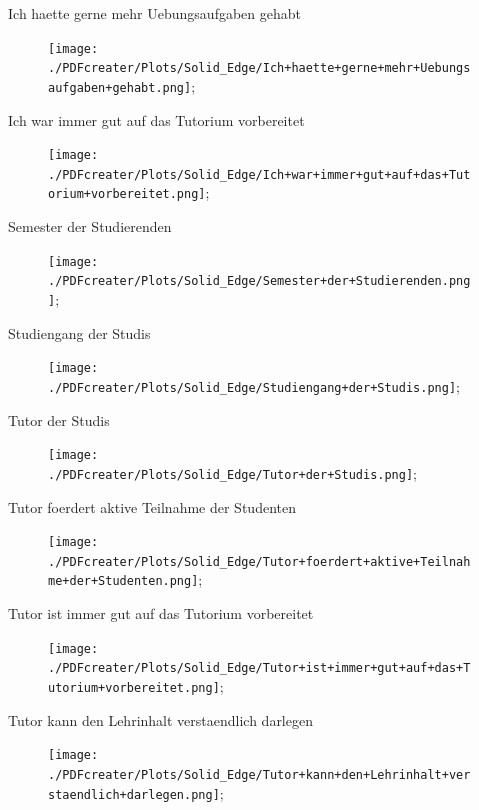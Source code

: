\documentclass[10pt]{beamer}
\begin{document}
\begin{frame}[fragile]{Ich haette gerne mehr Uebungsaufgaben gehabt} 
 \begin{figure}
 \texttt{[image: ./PDFcreater/Plots/Solid\_Edge/Ich+haette+gerne+mehr+Uebungsaufgaben+gehabt.png]};
 \end{figure}
 \end{frame}
\begin{frame}[fragile]{Ich war immer gut auf das Tutorium vorbereitet} 
 \begin{figure}
 \texttt{[image: ./PDFcreater/Plots/Solid\_Edge/Ich+war+immer+gut+auf+das+Tutorium+vorbereitet.png]};
 \end{figure}
 \end{frame}
\begin{frame}[fragile]{Semester der Studierenden} 
 \begin{figure}
 \texttt{[image: ./PDFcreater/Plots/Solid\_Edge/Semester+der+Studierenden.png]};
 \end{figure}
 \end{frame}
\begin{frame}[fragile]{Studiengang der Studis} 
 \begin{figure}
 \texttt{[image: ./PDFcreater/Plots/Solid\_Edge/Studiengang+der+Studis.png]};
 \end{figure}
 \end{frame}
\begin{frame}[fragile]{Tutor der Studis} 
 \begin{figure}
 \texttt{[image: ./PDFcreater/Plots/Solid\_Edge/Tutor+der+Studis.png]};
 \end{figure}
 \end{frame}
\begin{frame}[fragile]{Tutor foerdert aktive Teilnahme der Studenten} 
 \begin{figure}
 \texttt{[image: ./PDFcreater/Plots/Solid\_Edge/Tutor+foerdert+aktive+Teilnahme+der+Studenten.png]};
 \end{figure}
 \end{frame}
\begin{frame}[fragile]{Tutor ist immer gut auf das Tutorium vorbereitet} 
 \begin{figure}
 \texttt{[image: ./PDFcreater/Plots/Solid\_Edge/Tutor+ist+immer+gut+auf+das+Tutorium+vorbereitet.png]};
 \end{figure}
 \end{frame}
\begin{frame}[fragile]{Tutor kann den Lehrinhalt verstaendlich darlegen} 
 \begin{figure}
 \texttt{[image: ./PDFcreater/Plots/Solid\_Edge/Tutor+kann+den+Lehrinhalt+verstaendlich+darlegen.png]};
 \end{figure}
 \end{frame}
\end{document}
